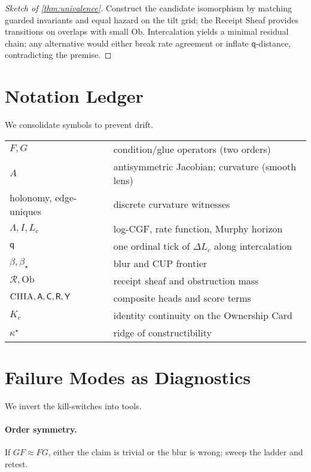 \documentclass[11pt]{article}
\newcommand{\1}{\mathbf{1}}
\newcommand{\rate}{I}
\newcommand{\Blur}{\beta}
\newcommand{\Lc}{L_c}
\newcommand{\LambdaCGF}{\Lambda}
\newcommand{\Fop}{F}
\newcommand{\Gop}{G}
\newcommand{\FG}{\Fop\Gop}
\newcommand{\GF}{\Gop\Fop}
\newcommand{\Aanti}{A}
\newcommand{\Qualon}{\mathsf{q}}        %
\newcommand{\CHIA}{\textsc{CHIA}}
\newcommand{\Align}{\mathsf{A}}
\newcommand{\Compat}{\mathsf{C}}
\newcommand{\Rare}{\mathsf{R}}
\newcommand{\Yield}{\mathsf{Y}}
\newcommand{\Sheaf}{\mathscr{R}}
\newcommand{\Ob}{\mathrm{Ob}}
\newcommand{\Kc}{K_c}      %
\begin{document}
\begin{proof}[Sketch of \cref{thm:univalence}]
Construct the candidate isomorphism by matching guarded invariants and equal hazard on the tilt grid; the Receipt Sheaf provides transitions on overlaps with small \(\Ob\). Intercalation yields a minimal residual chain; any alternative would either break rate agreement or inflate \(\Qualon\)-distance, contradicting the premise.
\end{proof}

\section{Notation Ledger}
We consolidate symbols to prevent drift.

\begin{center}
\begin{tabular}{ll}
\(\Fop,\Gop\) & condition/glue operators (two orders) \\
\(\Aanti\) & antisymmetric Jacobian; curvature (smooth lens) \\
holonomy, edge-uniques & discrete curvature witnesses \\
\(\LambdaCGF,\rate,\Lc\) & log-CGF, rate function, Murphy horizon \\
\(\Qualon\) & one ordinal tick of \(\Delta \Lc\) along intercalation \\
\(\Blur,\Blur_\star\) & blur and CUP frontier \\
\(\Sheaf,\Ob\) & receipt sheaf and obstruction mass \\
\(\CHIA,\Align,\Compat,\Rare,\Yield\) & composite heads and score terms \\
\(\Kc\) & identity continuity on the Ownership Card \\
\(\kappa^\star\) & ridge of constructibility \\
\end{tabular}
\end{center}

\section{Failure Modes as Diagnostics}
We invert the kill-switches into tools.

\paragraph{Order symmetry.} If \(\GF\approx \FG\), either the claim is trivial or the blur is wrong; sweep the ladder and retest.
\end{document}
